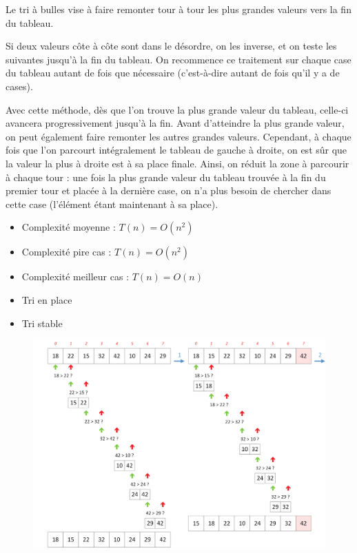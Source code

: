 \documentclass[11pt,a4paper]{article}
\begin{document}
\medskip

Le tri à bulles vise à faire remonter tour à tour les plus grandes valeurs vers la fin du tableau.

\medskip

Si deux valeurs côte à côte sont dans le désordre, on les inverse, et on teste les suivantes jusqu'à la fin du tableau.
On recommence ce traitement sur chaque case du tableau autant de fois que nécessaire (c'est-à-dire autant de fois qu'il y a de cases).

\medskip

Avec cette méthode, dès que l'on trouve la plus grande valeur du tableau, celle-ci avancera progressivement jusqu'à la fin.
Avant d'atteindre la plus grande valeur, on peut également faire remonter les autres grandes valeurs.
Cependant, à chaque fois que l'on parcourt intégralement le tableau de gauche à droite, on est sûr que la valeur la plus à droite est à sa place finale.
Ainsi, on réduit la zone à parcourir à chaque tour : une fois la plus grande valeur du tableau trouvée à la fin du premier tour et placée à la dernière case, on n'a plus besoin de chercher dans cette case (l'élément étant maintenant à sa place).

\medskip

\begin{itemize}
\item Complexité moyenne : $ T(n) = O(n^{2}) $
\item Complexité pire cas : $ T(n) = O(n^{2}) $
\item Complexité meilleur cas : $ T(n) = O(n) $
\item Tri en place
\item Tri stable
\end{itemize}


\medskip


\begin{figure}[ht!]
\centering
\centerline{
\includegraphics[width=1.2\textwidth]{img/tris/2_per_pages/BubbleSort_part1.png}
}
\end{figure}
\end{document}
